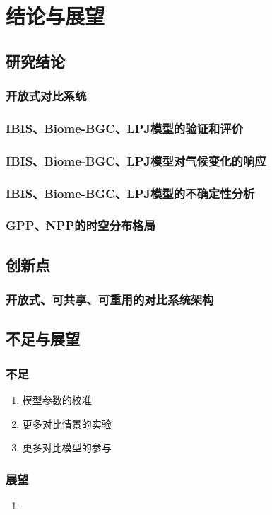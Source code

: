\chapter{结论与展望}

\section{研究结论}
\subsection{开放式对比系统}
\subsection{IBIS、Biome-BGC、LPJ模型的验证和评价}
\subsection{IBIS、Biome-BGC、LPJ模型对气候变化的响应}
\subsection{IBIS、Biome-BGC、LPJ模型的不确定性分析}
\subsection{GPP、NPP的时空分布格局}

\section{创新点}
\subsection{开放式、可共享、可重用的对比系统架构}

\section{不足与展望}
\subsection{不足}
\begin{enumerate}[(1)]
    \item 模型参数的校准
    \item 更多对比情景的实验
    \item 更多对比模型的参与
\end{enumerate}

\subsection{展望}
\begin{enumerate}[(1)]
    \item 
\end{enumerate}
